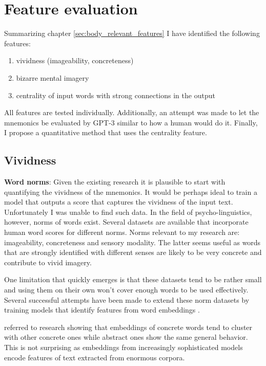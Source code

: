 \section{Feature evaluation} \label{sec:body_feature_evaluation}

Summarizing chapter \ref{sec:body_relevant_features} I have identified the following features:
\begin{enumerate}
    \item vividness (imageability, concreteness)
    \item bizarre mental imagery
    \item centrality of input words with strong connections in the output
\end{enumerate}
All features are tested individually. Additionally, an attempt was made to let the mnemonics be evaluated by GPT-3 similar to how a human would do it. 
Finally, I propose a quantitative method that uses the centrality feature.

\subsection{Vividness}
\textbf{Word norms}: Given the existing research it is plausible to start with quantifying the vividness of the mnemonics. It would be perhaps ideal to train a model that outputs a score that captures the vividness of the input text. Unfortunately I was unable to find such data. In the field of psycho-linguistics, however, norms of words exist. Several datasets are available that incorporate human word scores for different norms. Norms relevant to my research are: imageability, concreteness and sensory modality. The latter seems useful as words that are strongly identified with different senses are likely to be very concrete and contribute to vivid imagery.

One limitation that quickly emerges is that these datasets tend to be rather small and using them on their own won't cover enough words to be used effectively. Several successful attempts have been made to extend these norm datasets by training models that identify features from word embeddings \cite{concr_embed_bert, img_concr_svm, fusing_ctx_embed_concr}.

\cite{concr_embed_bert} referred to research showing that embeddings of concrete words tend to cluster with other concrete ones while abstract ones show the same general behavior. This is not surprising as embeddings from increasingly sophisticated models encode features of text extracted from enormous corpora.

